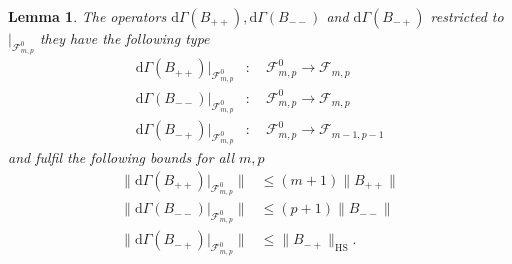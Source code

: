 \documentclass[b5paper,draft,openbib,12pt]{memoir}
\newtheorem{Lemma}[Def]{Lemma}
\begin{document}
\begin{Lemma}
The operators \(\mathrm{d}\Gamma(B_{++}),\mathrm{d}\Gamma(B_{--})\) and \(\mathrm{d}\Gamma(B_{-+})\) 
restricted to \(|_{\mathcal{F}^0_{m,p}}\) they have the following type
\begin{align}
\mathrm{d}\Gamma(B_{++})|_{\mathcal{F}^0_{m,p}}&: \quad \mathcal{F}^0_{m,p} \rightarrow \mathcal{F}_{m,p}\\
\mathrm{d}\Gamma(B_{--})|_{\mathcal{F}^0_{m,p}}&: \quad \mathcal{F}^0_{m,p} \rightarrow \mathcal{F}_{m,p}\\
\mathrm{d}\Gamma(B_{-+})|_{\mathcal{F}^0_{m,p}}&: \quad \mathcal{F}^0_{m,p} \rightarrow \mathcal{F}_{m-1,p-1}
\end{align}
 and fulfil
the following bounds for all \(m,p\)
\begin{align}
\|\mathrm{d}\Gamma(B_{++})|_{\mathcal{F}^0_{m,p}}\|&\le (m+1)\|B_{++}\|\\
\|\mathrm{d}\Gamma(B_{--})|_{\mathcal{F}^0_{m,p}}\|&\le (p+1)\|B_{--}\|\\
\|\mathrm{d}\Gamma(B_{-+})|_{\mathcal{F}^0_{m,p}}\|&\le \|B_{-+}\|_{\text{HS}}.
\end{align}
\end{Lemma}
\end{document}
